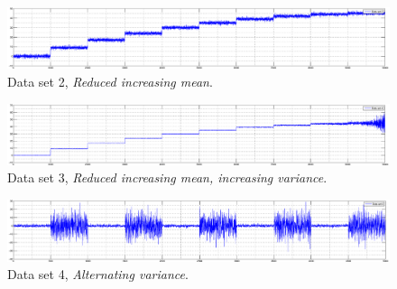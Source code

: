 \begin{figure}
\centering
  \includegraphics[width=1\textwidth]{./Figures/chapter5/set_2_data.eps}
  \caption[Reduced increasing mean]{Data set 2, \emph{Reduced increasing mean}.}
  \label{fig:takeuchi_reduced_increasing_mean}
\end{figure}

\begin{figure}
\centering
  \includegraphics[width=1\textwidth]{./Figures/chapter5/set_3_data.eps}
  \caption[Reduced increasing mean, increasing variance]{Data set 3, \emph{Reduced increasing mean, increasing variance}.}
  \label{fig:camci_reduced_increasing_mean_increasing_variance}
\end{figure}

\begin{figure}
\centering
  \includegraphics[width=1\textwidth]{./Figures/chapter5/set_4_data.eps}
  \caption[Alternating variance]{Data set 4, \emph{Alternating variance}.}
  \label{fig:camci_takeuchi_alternating_variance}
\end{figure}